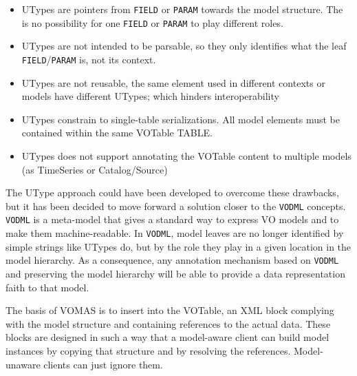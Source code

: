 \begin{itemize}
  \item UTypes are pointers from \texttt{FIELD} or \texttt{PARAM} towards the 
  model structure. The is no possibility for one  \texttt{FIELD} or
  \texttt{PARAM} to play different roles.
  \item UTypes are not intended to be parsable, so they only identifies what the leaf 
  \texttt{FIELD}/\texttt{PARAM} is, not its context.
  \item UTypes are not reusable, the same element used in different contexts or models 
  have different UTypes; which hinders interoperability
  \item UTypes constrain to single-table serializations. All model elements must 
  be contained within the same VOTable TABLE.
  \item UTypes does not support annotating the VOTable content to multiple models 
  (as TimeSeries or Catalog/Source)
\end{itemize}

The UType approach could have been developed to overcome these drawbacks, but it has been decided to move forward a solution closer to the \texttt{VODML} \citep{2018ivoa.spec.0910L} concepts. 
 \texttt{VODML} is a meta-model that gives a standard way to express VO models and to make them machine-readable.
In \texttt{VODML},  model leaves are no longer identified by simple strings like UTypes do, but by the role they play in a given location in the model hierarchy.
As a consequence, any annotation mechanism based on \texttt{VODML} and preserving the model hierarchy will be able  to provide a data representation faith to that model.

The basis of VOMAS is to insert into the VOTable, an XML block complying with the 
model structure and containing references to the actual data.
These blocks are designed in such a way that a model-aware client can build  model instances by copying that structure and by resolving the references. Model-unaware clients can just ignore them. 





